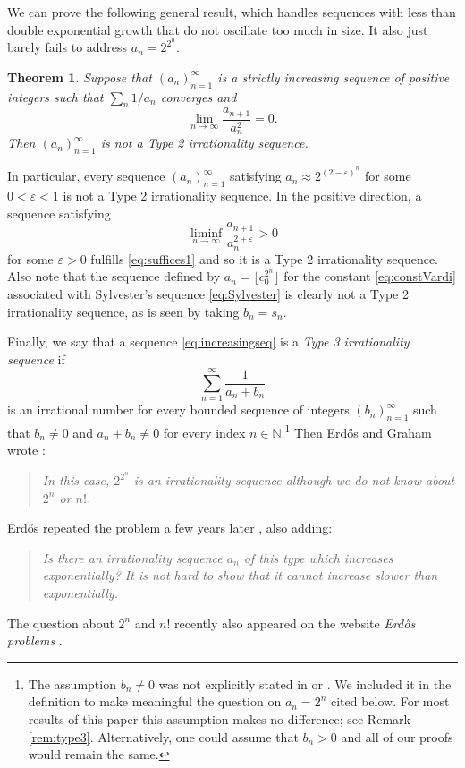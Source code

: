 \documentclass[11pt,letterpaper,reqno]{amsart}
\numberwithin{equation}{section}
\newtheorem{theorem}{Theorem}[section]
\theoremstyle{definition}
\numberwithin{equation}{section}
\begin{document}
We can prove the following general result, which handles sequences with less than double exponential growth that do not oscillate too much in size. It also just barely fails to address $a_n=2^{2^n}$.

\begin{theorem}\label{thm:type2}
Suppose that $(a_n)_{n=1}^{\infty}$ is a strictly increasing sequence of positive integers such that $\sum_n 1/a_n$ converges and
\begin{equation}\label{eq:t2cond}
\lim_{n\to\infty} \frac{a_{n+1}}{a_n^2} = 0.
\end{equation}
Then $(a_n)_{n=1}^{\infty}$ is not a Type 2 irrationality sequence.
\end{theorem}

In particular, every sequence $(a_n)_{n=1}^{\infty}$ satisfying $a_n\approx 2^{(2-\varepsilon)^n}$ for some $0<\varepsilon<1$ is not a Type 2 irrationality sequence.
In the positive direction, a sequence satisfying
\[ \liminf_{n\to\infty} \frac{a_{n+1}}{a_n^{2+\varepsilon}}>0 \]
for some $\varepsilon>0$ fulfills \eqref{eq:suffices1} and so it is a Type 2 irrationality sequence.
Also note that the sequence defined by $a_n = \lfloor c_0^{2^n} \rfloor$ for the constant \eqref{eq:constVardi} associated with Sylvester's sequence \eqref{eq:Sylvester} is clearly not a Type 2 irrationality sequence, as is seen by taking $b_n=s_n$.

\smallskip
Finally, we say that a sequence \eqref{eq:increasingseq} is a \emph{Type 3 irrationality sequence} if
\[ \sum_{n=1}^{\infty}\frac{1}{a_n + b_n} \]
is an irrational number for every bounded sequence of integers $(b_n)_{n=1}^{\infty}$ such that $b_n \neq 0$ and $a_n + b_n \neq 0$ for every index $n\in\mathbb{N}$.\footnote{The assumption $b_n\neq 0$ was not explicitly stated in \cite{EG80} or \cite{Erd88}. We included it in the definition to make meaningful the question on $a_n=2^n$ cited below. For most results of this paper this assumption makes no difference; see Remark \ref{rem:type3}. Alternatively, one could assume that $b_n>0$ and all of our proofs would remain the same.} Then Erd\H{o}s and Graham wrote \cite[p.~63]{EG80}:
\begin{quote}
\emph{In this case, $2^{2^n}$ is an irrationality sequence although we do not know about $2^n$ or $n!$.}
\end{quote}
Erd\H{o}s repeated the problem a few years later \cite[p.~105]{Erd88}, also adding:
\begin{quote}
\emph{Is there an irrationality sequence $a_n$ of this type which increases exponentially? It is not hard to show that it cannot increase slower than exponentially.}
\end{quote}
The question about $2^n$ and $n!$ recently also appeared on the website \emph{Erd\H{o}s problems} \cite[Problem \#264]{EP}.
\end{document}
